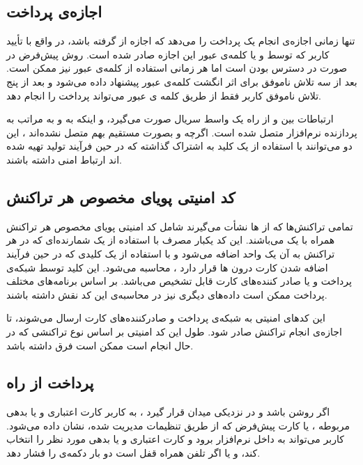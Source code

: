 \documentclass[oneside]{report}
\begin{document}
\subsection{اجازه‌ی پرداخت}

{\normalsize {}}
تنها زمانی اجازه‌ی انجام یک پرداخت را می‌دهد که اجازه از 
{\normalsize {}}
گرفته باشد، در واقع با تأیید کاربر که توسط 
{\normalsize {}} 
و یا کلمه‌ی عبور این اجازه صادر شده است. 
{\normalsize {}} 
روش پیش‌فرض در صورت در دسترس بودن است اما هر زمانی استفاده از کلمه‌ی عبور نیز ممکن است. بعد از سه تلاش ناموفق برای اثر انگشت کلمه‌ی عبور پیشنهاد داده می‌شود و بعد از پنج تلاش ناموفق کاربر فقط از طریق کلمه ی عبور می‌تواند پرداخت را انجام دهد. 

ارتباطات بین 
{\normalsize {}}
 و
 {\normalsize {}}
  از راه یک واسط سریال صورت می‌گیرد، و اینکه 
  {\normalsize {}} 
  به 
  {\normalsize {}}
  و به مراتب به پردازنده نرم‌افزار متصل شده است. اگرچه 
  {\normalsize {}}
  و
  {\normalsize {}}
  بصورت مستقیم بهم متصل نشده‌اند ، این دو می‌توانند با استفاده‌ از یک کلید به اشتراک گذاشته که در حین فرآیند تولید تهیه شده اند ارتباط امنی داشته باشند. 
   	      				 
  \subsection{کد امنیتی پویای مخصوص هر تراکنش  } 	      			
تمامی تراکنش‌ها که از 
  {\normalsize {}} ها
  نشأت می‌گیرند شامل کد امنیتی پویای مخصوص هر تراکنش 
   همراه با یک 
     {\normalsize {}}
     می‌باشند. این کد یکبار مصرف با استفاده از یک شمارنده‌ای که در هر تراکنش به آن یک واحد اضافه می‌شود  و با استفاده از یک کلیدی که در حین فرآیند اضافه شدن کارت درون 
       {\normalsize {}}ها
       قرار دارد ، محاسبه می‌شود. این کلید توسط شبکه‌ی 	پرداخت و یا صادر کننده‌های کارت قابل تشخیص می‌باشد. بر اساس برنامه‌های مختلف پرداخت ممکن است داده‌های دیگری نیز در محاسبه‌ی این کد نقش داشته باشند. 
       
       این کدهای امنیتی به شبکه‌ی پرداخت و صادرکننده‌های کارت ارسال می‌شوند، تا اجازه‌ی انجام تراکنش صادر شود. طول این کد امنیتی بر اساس نوع تراکنشی که در حال انجام است ممکن است فرق داشته باشد. 
       
 \subsection{پرداخت از راه {\small {}} }
 اگر 
 {\normalsize {}}
 روشن باشد و در نزدیکی میدان 
 {\normalsize {}}
 قرار گیرد ، به کاربر کارت اعتباری و یا بدهی مربوطه ، یا کارت پیش‌فرض که از طریق تنظیمات مدیریت شده، نشان داده می‌شود. 
 کاربر می‌تواند به داخل نرم‌افزار 
 {\normalsize {}} 
 برود و کارت اعتباری و یا بدهی مورد نظر را انتخاب کند، و یا اگر تلفن همراه قفل است دو بار دکمه‌ی 
 {\normalsize {}} 
 را فشار دهد. 
 
\end{document}

